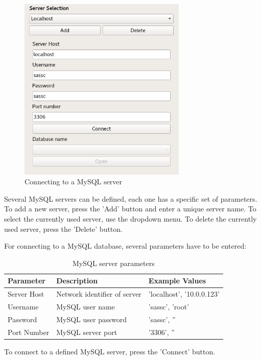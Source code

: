 \documentclass[10pt,letterpaper,extrafontsizes]{memoir}
\begin{document}
\begin{figure}[H]
  \center
    \includegraphics[width=8cm]{../screenshots/mysql_server_selection.png}
  \caption{Connecting to a MySQL server}
  \label{fig:mysql_connect}
\end{figure}

Several MySQL servers can be defined, each one has a specific set of parameters. To add a new server, press the 'Add' button and enter a unique server name. To select the currently used server, use the dropdown menu. To delete the currently used server, press the 'Delete' button.

For connecting to a MySQL database, several parameters have to be entered:

\begin{table}[H]
  \center
  \begin{tabular}{ | l | l | l |}
    \hline
    \textbf{Parameter} & \textbf{Description} & \textbf{Example Values} \\ \hline
    Server Host & Network identifier of server & 'localhost', '10.0.0.123' \\ \hline
    Username & MySQL user name & 'sassc', 'root' \\ \hline
    Password & MySQL user password & 'sassc', '' \\ \hline
    Port Number & MySQL server port & '3306', '' \\
    \hline
  \end{tabular}
  \caption{MySQL server parameters}
\end{table}

To connect to a defined MySQL server, press the 'Connect' button.\\
\end{document}

